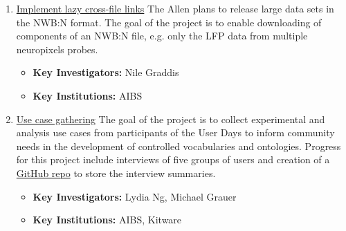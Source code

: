 \documentclass{article}
\begin{document}
\begin{enumerate}
    \setcounter{enumi}{\theprojectEnumCounter}  %
            
    \item \href{https://neurodatawithoutborders.github.io/nwb_hackathons/HCK06_2019_Janelia/projects/lazy_cross_file_links/}{Implement lazy cross-file links} The Allen plans to release large data sets in the NWB:N format. The goal of the project is to enable downloading of components of an NWB:N file, e.g. only the LFP data from multiple neuropixels probes. 
        \vspace{-0.2cm}
        \begin{itemize}[noitemsep]
            \item \textbf{Key Investigators:} Nile Graddis
            \item \textbf{Key Institutions:} AIBS
        \end{itemize}
    
    \item \href{https://neurodatawithoutborders.github.io/nwb_hackathons/HCK06_2019_Janelia/projects/UseCaseGathering/}{Use case gathering} The goal of the project is to collect experimental and analysis use cases from participants of the User Days to inform community needs in the development of controlled vocabularies and ontologies. Progress for this project include interviews of five groups of users and creation of a \href{https://github.com/NeurodataWithoutBorders/ontology-project/tree/master/use-cases}{GitHub repo} to store the interview summaries.
        \vspace{-0.2cm}
        \begin{itemize}[noitemsep]
            \item \textbf{Key Investigators:} Lydia Ng, Michael Grauer
            \item \textbf{Key Institutions:} AIBS, Kitware
        \end{itemize}
        

\end{enumerate}
\end{document}
